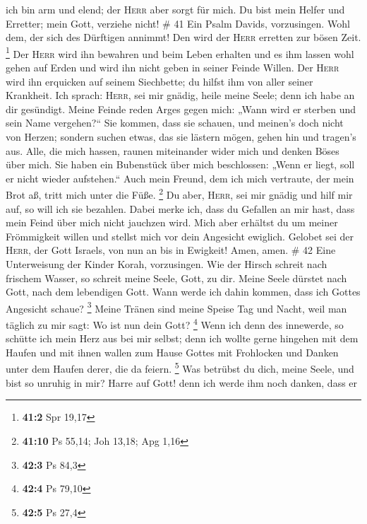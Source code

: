 ich bin arm und elend; der \textsc{Herr} aber sorgt für mich. Du bist
mein Helfer und Erretter; mein Gott, verziehe nicht! \# 41
 Ein Psalm Davids, vorzusingen.  Wohl dem,
der sich des Dürftigen annimmt! Den wird der \textsc{Herr} erretten zur
bösen Zeit. \footnote{\textbf{41:2} Spr 19,17}  Der
\textsc{Herr} wird ihn bewahren und beim Leben erhalten und es ihm
lassen wohl gehen auf Erden und wird ihn nicht geben in seiner Feinde
Willen.  Der \textsc{Herr} wird ihn erquicken auf seinem
Siechbette; du hilfst ihm von aller seiner Krankheit.  Ich
sprach: \textsc{Herr}, sei mir gnädig, heile meine Seele; denn ich habe
an dir gesündigt.  Meine Feinde reden Arges gegen mich:
„Wann wird er sterben und sein Name vergehen?{}``  Sie
kommen, dass sie schauen, und meinen's doch nicht von Herzen; sondern
suchen etwas, das sie lästern mögen, gehen hin und tragen's aus.
 Alle, die mich hassen, raunen miteinander wider mich und
denken Böses über mich.  Sie haben ein Bubenstück über
mich beschlossen: „Wenn er liegt, soll er nicht wieder aufstehen.``
 Auch mein Freund, dem ich mich vertraute, der mein Brot
aß, tritt mich unter die Füße. \footnote{\textbf{41:10} Ps 55,14; Joh
  13,18; Apg 1,16}  Du aber, \textsc{Herr}, sei mir
gnädig und hilf mir auf, so will ich sie bezahlen.  Dabei
merke ich, dass du Gefallen an mir hast, dass mein Feind über mich nicht
jauchzen wird.  Mich aber erhältst du um meiner
Frömmigkeit willen und stellst mich vor dein Angesicht ewiglich.
 Gelobet sei der \textsc{Herr}, der Gott Israels, von nun
an bis in Ewigkeit! Amen, amen. \# 42  Eine Unterweisung
der Kinder Korah, vorzusingen.  Wie der Hirsch schreit
nach frischem Wasser, so schreit meine Seele, Gott, zu dir.
 Meine Seele dürstet nach Gott, nach dem lebendigen Gott.
Wann werde ich dahin kommen, dass ich Gottes Angesicht schaue?
\footnote{\textbf{42:3} Ps 84,3}  Meine Tränen sind meine
Speise Tag und Nacht, weil man täglich zu mir sagt: Wo ist nun dein
Gott? \footnote{\textbf{42:4} Ps 79,10}  Wenn ich denn des
innewerde, so schütte ich mein Herz aus bei mir selbst; denn ich wollte
gerne hingehen mit dem Haufen und mit ihnen wallen zum Hause Gottes mit
Frohlocken und Danken unter dem Haufen derer, die da feiern. \footnote{\textbf{42:5}
  Ps 27,4}  Was betrübst du dich, meine Seele, und bist so
unruhig in mir? Harre auf Gott! denn ich werde ihm noch danken, dass er
